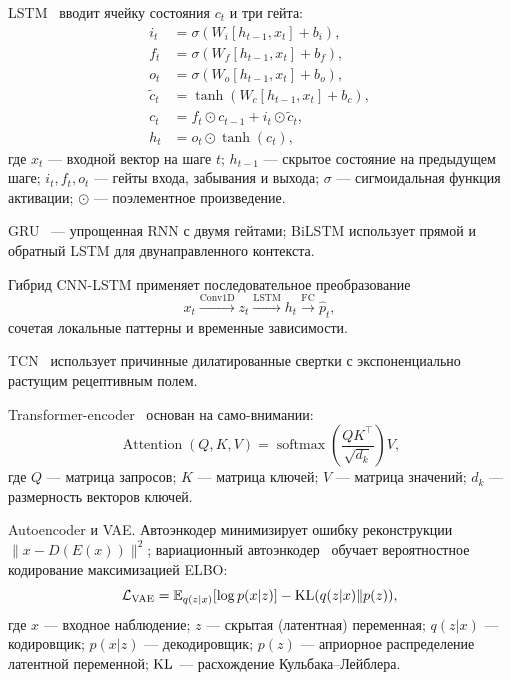 LSTM~\cite{hochreiter1997lstm} вводит ячейку состояния \(c_t\) и три
гейта:
\begin{align}
i_t &= \sigma(W_i [h_{t-1}, x_t] + b_i), \nonumber\\
f_t &= \sigma(W_f [h_{t-1}, x_t] + b_f), \nonumber\\
o_t &= \sigma(W_o [h_{t-1}, x_t] + b_o), \nonumber\\
\tilde{c}_t &= \tanh(W_c [h_{t-1}, x_t] + b_c), \nonumber\\
c_t &= f_t \odot c_{t-1} + i_t \odot \tilde{c}_t, \nonumber\\
h_t &= o_t \odot \tanh(c_t),
\label{eq:lstm}
\end{align}
где \(x_t\) --- входной вектор на шаге \(t\);
\(h_{t-1}\) --- скрытое состояние на предыдущем шаге;
\(i_t, f_t, o_t\) --- гейты входа, забывания и выхода;
\(\sigma\) --- сигмоидальная функция активации;
\(\odot\) --- поэлементное произведение.

GRU~\cite{cho2014gru} --- упрощенная RNN с двумя гейтами;
BiLSTM использует прямой и обратный LSTM для двунаправленного
контекста.

Гибрид CNN-LSTM применяет последовательное преобразование
\[
x_t \xrightarrow{\text{Conv1D}} z_t \xrightarrow{\text{LSTM}} h_t
\xrightarrow{\text{FC}} \hat{p}_t,
\]
сочетая локальные паттерны и временные зависимости.

TCN~\cite{bai2018tcn} использует причинные дилатированные свертки с
экспоненциально растущим рецептивным полем.

Transformer-encoder~\cite{vaswani2017attention} основан на
само-внимании:
\begin{equation}
\operatorname{Attention}(Q, K, V) =
\operatorname{softmax}\!\left(\frac{QK^{\top}}{\sqrt{d_k}}\right) V,
\label{eq:attention}
\end{equation}
где \(Q\) --- матрица запросов; \(K\) --- матрица ключей;
\(V\) --- матрица значений; \(d_k\) --- размерность векторов ключей.

Autoencoder и VAE. Автоэнкодер минимизирует ошибку реконструкции
\(\|x - D(E(x))\|^2\); вариационный
автоэнкодер~\cite{kingma2014vae} обучает вероятностное кодирование
максимизацией ELBO:
\begin{equation}
\mathcal{L}_{\text{VAE}} =
\mathbb{E}_{q(z|x)}[\log p(x|z)] - \operatorname{KL}(q(z|x)\|p(z)),
\label{eq:vae}
\end{equation}
где \(x\) --- входное наблюдение; \(z\) --- скрытая (латентная)
переменная; \(q(z|x)\) --- кодировщик; \(p(x|z)\) --- декодировщик;
\(p(z)\) --- априорное распределение латентной переменной;
\(\operatorname{KL}\) --- расхождение Кульбака--Лейблера.

